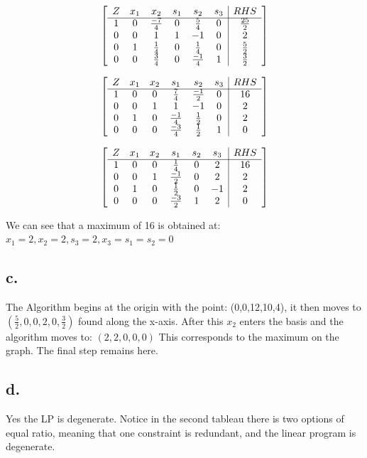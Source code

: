 \documentclass[10pt, letterpaper]{paper}
\begin{document}
\[
	\left[ {\begin{array}{cccccc|c}
	Z & x_1 & x_2 & s_1 & s_2 & s_3 & RHS\\ \cline{1-7}
	1 & 0 & \frac{-7}{4} & 0 & \frac{5}{4} & 0 & \frac{25}{2} \\
	0 & 0 & 1 & 1 & -1 & 0 & 2 \\
	0 & 1 & \frac{1}{4} & 0 & \frac{1}{4} & 0 & \frac{5}{2} \\
	0 & 0 & \frac{3}{4} & 0 & \frac{-1}{4} & 1 & \frac{3}{2} \\
	\end{array} } \right]
\]

\[
	\left[ {\begin{array}{cccccc|c}
	Z & x_1 & x_2 & s_1 & s_2 & s_3 & RHS\\ \cline{1-7}
	1 & 0 & 0 & \frac{7}{4} & \frac{-1}{2} & 0 & 16 \\
	0 & 0 & 1 & 1 & -1 & 0 & 2 \\
	0 & 1 & 0 & \frac{-1}{4} & \frac{1}{2} & 0 & 2 \\
	0 & 0 & 0 & \frac{-3}{4} & \frac{1}{2} & 1 & 0 \\
	\end{array} } \right]
\]

\[
	\left[ {\begin{array}{cccccc|c}
	Z & x_1 & x_2 & s_1 & s_2 & s_3 & RHS\\ \cline{1-7}
	1 & 0 & 0 & \frac{1}{4} & 0 & 2 & 16 \\
	0 & 0 & 1 & \frac{-1}{2} & 0 & 2 & 2 \\
	0 & 1 & 0 & \frac{1}{2} & 0 & -1 & 2 \\
	0 & 0 & 0 & \frac{-3}{2} & 1 & 2 & 0 \\
	\end{array} } \right]
\]

We can see that a maximum of 16 is obtained at: $x_1 = 2,x_2 = 2, s_3 = 2,x_3=s_1=s_2 =0$ 

\subsection*{c.}
The Algorithm begins at the origin with the point: (0,0,12,10,4), it then moves to $(\frac{5}{2}, 0, 0, 2, 0, \frac{3}{2})$ found along the x-axis. After this $x_2$ enters the basis and the algorithm moves to: $(2,2,0,0,0)$ This corresponds to the maximum on the graph. The final step remains here.   


\subsection*{d.}
Yes the LP is degenerate. Notice in the second tableau there is two options of equal ratio, meaning that one constraint is redundant, and the linear program is degenerate. 
\end{document}
